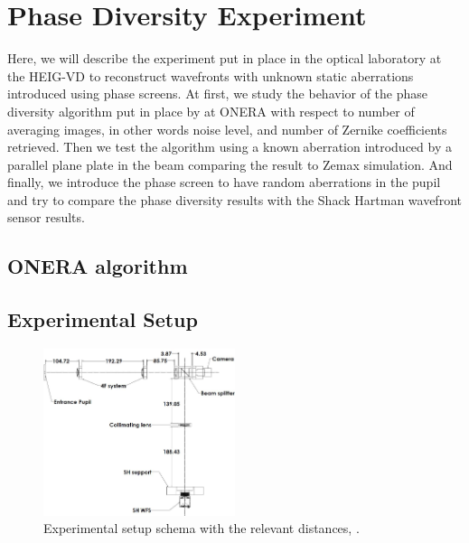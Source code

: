 
\chapter{Phase Diversity Experiment} 
\label{ch:PDExp}

Here, we will describe the experiment put in place in the optical laboratory at the HEIG-VD to reconstruct wavefronts with unknown static aberrations introduced using phase screens. At first, we study the  behavior of the phase diversity algorithm put in place by \citet{mugnier_2006} at ONERA with respect to number of averaging images, in other words noise level, and number of Zernike coefficients retrieved. Then we test the algorithm using a known aberration introduced by a parallel plane plate in the beam comparing the result to Zemax simulation. And finally, we introduce the phase screen to have random aberrations in the pupil and try to compare the phase diversity results with the Shack Hartman wavefront sensor results.


\section{ONERA algorithm}
\label{sec:ONERAalgorithm}




\section{Experimental Setup}
\label{sec:ExpSetup}

\begin{figure}
\centering
\includegraphics[width=0.5\textwidth]{Figures/setupSchema.JPG}
\decoRulewrapFig
\caption[Experimental Setup Schema]{Experimental setup schema with the relevant distances, \citep{Bouxin_PDM}.}
\label{fig:setupSchema}
\end{figure}

